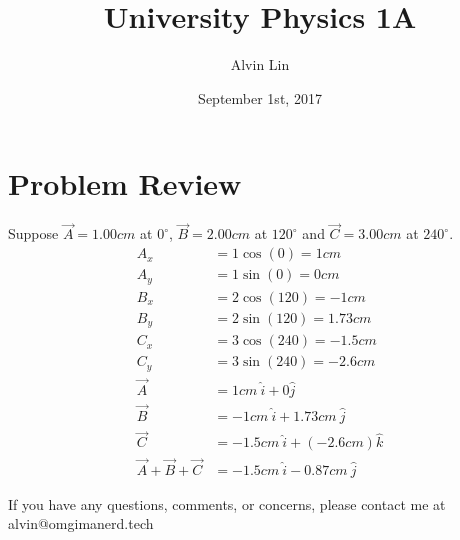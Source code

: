 \documentclass[letterpaper, 12pt]{math}
\title{University Physics 1A}
\author{Alvin Lin}
\date{September 1st, 2017}
\begin{document}
\maketitle

\section*{Problem Review}
Suppose \( \vec{A} = 1.00cm \) at \( 0^{\circ} \), \( \vec{B} = 2.00cm \) at
\( 120^{\circ} \) and \( \vec{C} = 3.00cm \) at \( 240^{\circ} \).
\begin{align*}
  A_{x} &= 1\cos(0) = 1cm \\
  A_{y} &= 1\sin(0) = 0cm \\
  B_{x} &= 2\cos(120) = -1cm \\
  B_{y} &= 2\sin(120) = 1.73 cm \\
  C_{x} &= 3\cos(240) = -1.5cm \\
  C_{y} &= 3\sin(240) =-2.6cm \\
  \vec{A} &= 1cm\ \hat{i}+0\hat{j} \\
  \vec{B} &= -1cm\ \hat{i}+1.73cm\ \hat{j} \\
  \vec{C} &= -1.5cm\ \hat{i}+(-2.6cm)\hat{k} \\
  \vec{A}+\vec{B}+\vec{C} &= -1.5cm\ \hat{i}-0.87cm\ \hat{j}
\end{align*}

\begin{center}
  If you have any questions, comments, or concerns, please contact me at
  alvin@omgimanerd.tech
\end{center}
\end{document}
